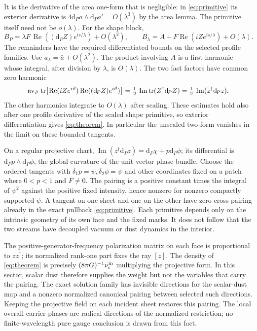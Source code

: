 \documentclass[11pt]{article}
\newcommand{\tr}{\operatorname{tr}}
\newcommand{\re}{\operatorname{Re}}
\newcommand{\im}{\operatorname{Im}}
\newcommand{\dd}{\mathrm d}
\begin{document}
It is the derivative of the area one-form that is
negligible: in \eqref{eq:primitive} its exterior derivative
is \(4\dd_{\!P}a\wedge\dd_{\!P}a'=O(\lambda^3)\) by
the area lemma. The primitive itself need not be
\(o(\lambda)\). For the shape block,
\[
 B_P=\lambda F\,\re((\dd_{\!P}Z)e^{is/\lambda})
          +O(\lambda^2),\qquad
 B_\lambda=A+F\re(iZe^{is/\lambda})+O(\lambda).
\]
The remainders have the required differentiated bounds
on the selected profile families. Use
\(a_\lambda=\bar a+O(\lambda^2)\).
The product involving \(A\) is a first harmonic whose
integral, after division by \(\lambda\), is \(O(\lambda)\).
The two fast factors have common zero harmonic
\begin{equation}\label{eq:shape-mean}
 {\rm av}_{\vartheta}\,
 \tr\!\left[\re(iZ e^{i\vartheta})
            \re((\dd_{\!P}Z)e^{i\vartheta})\right]
   =\tfrac12\,\im\tr(Z^\dagger\dd_{\!P}Z)
   =\tfrac12\,\im(z^\dagger\dd_{\!P}z).
\end{equation}
The other harmonics integrate to \(O(\lambda)\) after
scaling. These estimates hold also after one profile
derivative of the scaled shape primitive, so exterior
differentiation gives \eqref{eq:theorem}. In particular
the unscaled two-form vanishes in the limit on these
bounded tangents.

On a regular projective chart,
\(\im(z^\dagger\dd_{\!P}z)=\dd_{\!P}\chi+
p\dd_{\!P}\phi\); its differential is
\(\dd_{\!P}p\wedge\dd_{\!P}\phi\), the global curvature
of the unit-vector phase bundle. Choose the ordered
tangents with \(\delta_1p=\psi,\delta_2\phi=\psi\)
and other coordinates fixed on a patch where
\(0<p<1\) and \(F\ne0\). The pairing is a positive
constant times the integral of \(\psi^2\) against
the positive fixed intensity, hence nonzero for
nonzero compactly supported \(\psi\). A tangent
on one sheet and one on the other have zero
cross pairing already in the exact pullback
\eqref{eq:primitive}. Each primitive depends only
on the intrinsic geometry of its own face and the
fixed marks. It does not follow that the two streams
have decoupled vacuum or dust dynamics in the interior.

The positive-generator-frequency polarization matrix
on each face is proportional to \(zz^\dagger\); its
normalized rank-one part fixes the ray \([z]\). The
density of \eqref{eq:theorem} is precisely
\((8\pi G)^{-1}\nu_i^{\rm in}\) multiplying the
projective form. In this sector, scalar dust therefore
supplies the weight but not the variables that carry
the pairing. The exact solution family has invisible
directions for the scalar-dust map and a nonzero
normalized canonical pairing between selected such
directions. Keeping the projective field on each
incident sheet restores this pairing. The local
overall carrier phases are radical directions of the
normalized restriction; no finite-wavelength pure
gauge conclusion is drawn from this fact.
\end{document}
